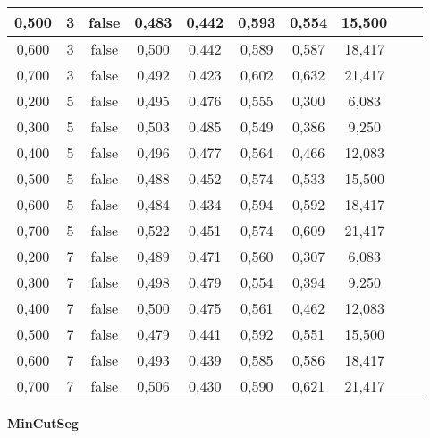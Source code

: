 \documentclass{article}
\begin{document}
\begin{longtable}[c]{|c|c|c|c|c|c|c|c|c|c|}
 0,500 & 3 & false & 0,483 & 0,442 & 0,593 & 0,554 & 15,500  \\ \hline 
 0,600 & 3 & false & 0,500 & 0,442 & 0,589 & 0,587 & 18,417  \\ \hline 
 0,700 & 3 & false & 0,492 & 0,423 & 0,602 & 0,632 & 21,417  \\ \hline 
 0,200 & 5 & false & 0,495 & 0,476 & 0,555 & 0,300 & 6,083  \\ \hline 
 0,300 & 5 & false & 0,503 & 0,485 & 0,549 & 0,386 & 9,250  \\ \hline 
 0,400 & 5 & false & 0,496 & 0,477 & 0,564 & 0,466 & 12,083  \\ \hline 
 0,500 & 5 & false & 0,488 & 0,452 & 0,574 & 0,533 & 15,500  \\ \hline 
 0,600 & 5 & false & 0,484 & 0,434 & 0,594 & 0,592 & 18,417  \\ \hline 
 0,700 & 5 & false & 0,522 & 0,451 & 0,574 & 0,609 & 21,417  \\ \hline 
 0,200 & 7 & false & 0,489 & 0,471 & 0,560 & 0,307 & 6,083  \\ \hline 
 0,300 & 7 & false & 0,498 & 0,479 & 0,554 & 0,394 & 9,250  \\ \hline 
 0,400 & 7 & false & 0,500 & 0,475 & 0,561 & 0,462 & 12,083  \\ \hline 
 0,500 & 7 & false & 0,479 & 0,441 & 0,592 & 0,551 & 15,500  \\ \hline 
 0,600 & 7 & false & 0,493 & 0,439 & 0,585 & 0,586 & 18,417  \\ \hline 
 0,700 & 7 & false & 0,506 & 0,430 & 0,590 & 0,621 & 21,417  \\ \hline 
 \end{longtable} 




 \newpage
{  
\large
\center
	\textbf{MinCutSeg}  

}
\end{document}
